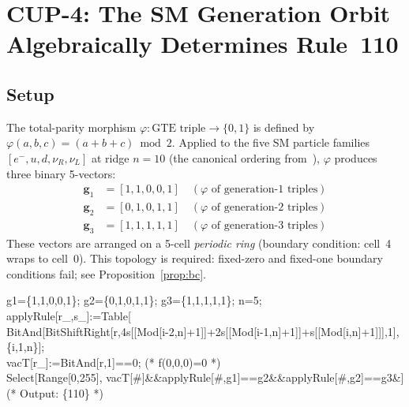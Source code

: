 \documentclass[11pt]{article}
\theoremstyle{remark}
\begin{document}
\section{CUP-4: The SM Generation Orbit Algebraically Determines Rule~110}
\label{sec:cup4}

\subsection{Setup}

The total-parity morphism $\varphi: \text{GTE triple} \to \{0,1\}$ is defined by
$\varphi(a,b,c) = (a+b+c) \bmod 2$. Applied to the five SM particle families
$[e^-, u, d, \nu_R, \nu_L]$ at ridge $n=10$ (the canonical ordering from~\cite{Spivack2025_FirstPrinciplesSM}),
$\varphi$ produces three binary 5-vectors:
\begin{align}
\mathbf{g}_1 &= [1,1,0,0,1] \quad(\varphi\text{ of generation-1 triples})\label{eq:gen1}\\
\mathbf{g}_2 &= [0,1,0,1,1] \quad(\varphi\text{ of generation-2 triples})\label{eq:gen2}\\
\mathbf{g}_3 &= [1,1,1,1,1] \quad(\varphi\text{ of generation-3 triples})\label{eq:gen3}
\end{align}
These vectors are arranged on a 5-cell \emph{periodic ring} (boundary condition:
cell~4 wraps to cell~0). This topology is required: fixed-zero and fixed-one boundary
conditions fail; see Proposition~\ref{prop:bc}.

\begin{tcolorbox}[colback=gray!3,colframe=gray!45!black,
  title={\textbf{CUP-4 check in 5 lines (Mathematica pseudocode)}},
  fonttitle=\bfseries,left=6pt,right=6pt,top=4pt,bottom=4pt]
\small\ttfamily
g1=\{1,1,0,0,1\}; g2=\{0,1,0,1,1\}; g3=\{1,1,1,1,1\}; n=5;\\[2pt]
applyRule[r\_,s\_]:=Table[\\
\quad BitAnd[BitShiftRight[r,4s[[Mod[i-2,n]+1]]+2s[[Mod[i-1,n]+1]]+s[[Mod[i,n]+1]]],1],\\
\{i,1,n\}];\\[2pt]
vacT[r\_]:=BitAnd[r,1]==0; \textrm{\normalfont\small (* f(0,0,0)=0 *)}\\[2pt]
Select[Range[0,255], vacT[\#]\&\&applyRule[\#,g1]==g2\&\&applyRule[\#,g2]==g3\&]\\[2pt]
\textrm{\normalfont\small (* Output: \{110\} *)}
\end{tcolorbox}
\end{document}

